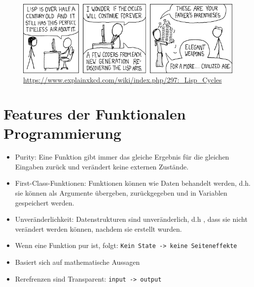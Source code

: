\documentclass{beamer}
\def\code#1{\texttt{#1}}
\begin{document}
\begin{frame}
	\begin{figure}
	    \centering
	    \includegraphics[width=1\linewidth]{bilder/lisp_cycles.png}
        \textmd{ \tiny \url{https://www.explainxkcd.com/wiki/index.php/297:_Lisp_Cycles}}
	\end{figure}
\end{frame}

\section{Features der Funktionalen Programmierung}
\begin{frame}
	\begin{itemize}
		\item Purity:  Eine Funktion gibt immer das gleiche Ergebnis für die gleichen Eingaben zurück und verändert keine externen Zustände.
		\item First-Class-Funktionen: Funktionen können wie Daten behandelt werden, d.h. sie können als Argumente übergeben, zurückgegeben und in Variablen gespeichert werden.
		\item Unveränderlichkeit: Datenstrukturen sind unveränderlich, d.h , dass sie nicht verändert werden können, nachdem sie erstellt wurden.
            \item Wenn eine Funktion pur ist, folgt: \code{Kein State -> keine Seiteneffekte}
            \item Basiert sich auf mathematische Aussagen
            \item Rerefrenzen sind Transparent:   \code{input -> output}
	\end{itemize}
\end{frame}
\end{document}
